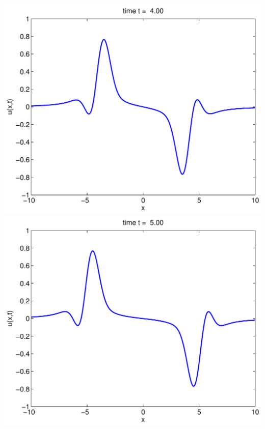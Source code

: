 {\begin{solution}
\begin{enumerate}
\begin{center}
          \includegraphics[scale=0.36]{dalembert4}\quad
          \includegraphics[scale=0.36]{dalembert5}
      \end{center}

      
\end{enumerate}
\end{solution}}{}

